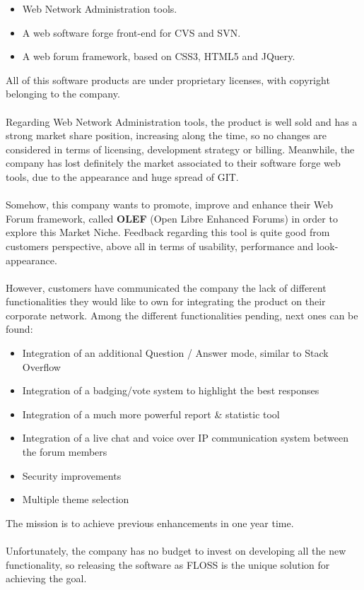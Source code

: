 \documentclass[11pt]{article}
\begin{document}
\begin{itemize}\itemsep0pt
\item{Web Network Administration tools.}
\item{A web software forge front-end for CVS and SVN.}
\item{A web forum framework, based on CSS3, HTML5 and JQuery.}
\end{itemize}
All of this software products are under proprietary licenses, with copyright belonging to the company.\\
\\
Regarding Web Network Administration tools, the product is well sold and has a strong market share position, increasing along the time, so no changes are considered in terms of licensing, development strategy or billing.
Meanwhile, the company has lost definitely the market associated to their software forge web tools, due to the appearance and huge spread of GIT.\\
\\
Somehow, this company wants to promote, improve and enhance their Web Forum framework, called \textbf{OLEF} (Open Libre Enhanced Forums) in order to explore this Market Niche. Feedback regarding this tool is quite good from customers perspective, above all in terms of usability, performance and look-appearance.\\
\\
However, customers have communicated the company the lack of different functionalities they would like to own for integrating the product on their corporate network. Among the different functionalities pending, next ones can be found:
\begin{itemize}\itemsep0pt
\item{Integration of an additional Question / Answer mode, similar to Stack Overflow}
\item{Integration of a badging/vote system to highlight the best responses}
\item{Integration of a much more powerful report \& statistic tool}
\item{Integration of a live chat and voice over IP communication system between the forum members}
\item{Security improvements}
\item{Multiple theme selection}
\end{itemize}
The mission is to achieve previous enhancements in one year time.\\
\\
Unfortunately, the company has no budget to invest on developing all the new functionality, so releasing the software as FLOSS is the unique solution for achieving the goal.\\
\end{document}
